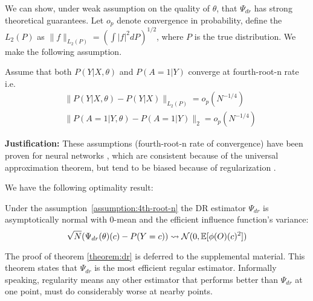 We can show, under weak assumption on the quality of $\theta$, that $\Psi_{dr}$ has strong theoretical guarantees.
Let $o_p$ denote convergence in probability, define the $L_2(P)$ as $\|f\|_{L_2(P)} = (\int |f|^2 dP)^{1/2}$, where $P$ is the true distribution. We make the following assumption.
\begin{assumption}\label{assumption:4th-root-n}
Assume that both $P(Y|X,\theta)$ and $P(A=1|Y)$ converge at fourth-root-n rate i.e.
\begin{equation}
\begin{aligned}
&\|P(Y|X,\theta) - P(Y|X)\|_{L_2(P)} = o_p(N^{-1/4})\\
&\|P(A=1|Y,\theta) - P(A=1|Y)\|_2 = o_p(N^{-1/4})
\end{aligned}
\end{equation} 
\end{assumption}
\noindent
\textbf{Justification:}
These assumptions (fourth-root-n rate of convergence) have been proven for neural networks \cite{riesznet}, which are consistent because of the universal approximation theorem, but tend to be biased because of regularization \cite{dml}.

We have the following optimality result:
\begin{theorem}  Under the assumption~\cref{assumption:4th-root-n} the DR estimator $\Psi_{dr}$ is asymptotically normal with 0-mean and the efficient influence function's variance:
\begin{equation}
\sqrt{N}(\Psi_{dr}(\theta)(c) - P(Y=c)) \rightsquigarrow \mathcal{N}(0, \mathbb{E}[\phi(O)(c)^2])
\end{equation}
\label{theorem:dr}
\end{theorem}
The proof of theorem \cref{theorem:dr} is deferred to the supplemental material. This theorem states that $\Psi_{dr}$ is the most efficient regular estimator. 
Informally speaking, regularity means any other estimator that performs better than $\Psi_{dr}$ at one point, must do considerably worse at nearby points.%


